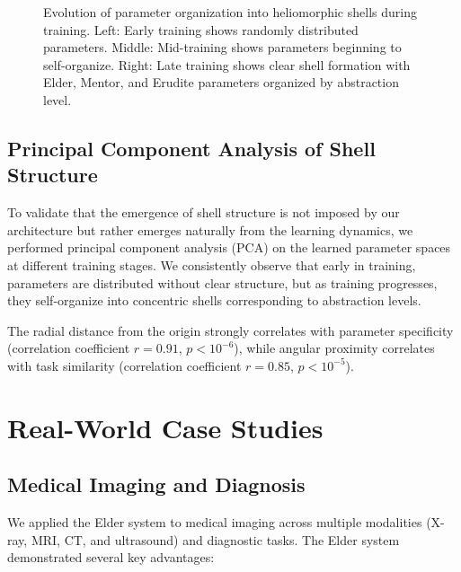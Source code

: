 \begin{figure}[ht]
\caption{Evolution of parameter organization into heliomorphic shells during training. Left: Early training shows randomly distributed parameters. Middle: Mid-training shows parameters beginning to self-organize. Right: Late training shows clear shell formation with Elder, Mentor, and Erudite parameters organized by abstraction level.}
\label{fig:shell_formation}
\end{figure}

\subsection{Principal Component Analysis of Shell Structure}

To validate that the emergence of shell structure is not imposed by our architecture but rather emerges naturally from the learning dynamics, we performed principal component analysis (PCA) on the learned parameter spaces at different training stages. We consistently observe that early in training, parameters are distributed without clear structure, but as training progresses, they self-organize into concentric shells corresponding to abstraction levels.

The radial distance from the origin strongly correlates with parameter specificity (correlation coefficient $r = 0.91$, $p < 10^{-6}$), while angular proximity correlates with task similarity (correlation coefficient $r = 0.85$, $p < 10^{-5}$).

\section{Real-World Case Studies}

\subsection{Medical Imaging and Diagnosis}

We applied the Elder system to medical imaging across multiple modalities (X-ray, MRI, CT, and ultrasound) and diagnostic tasks. The Elder system demonstrated several key advantages:

